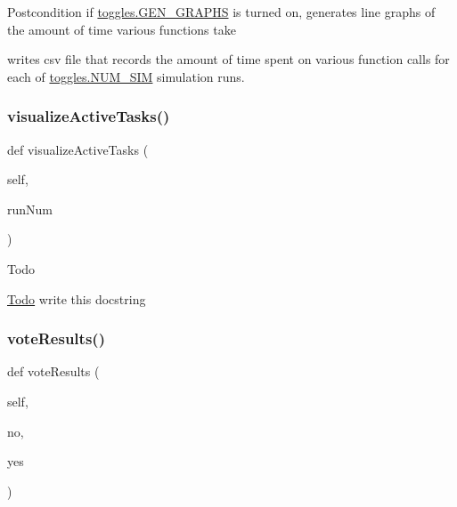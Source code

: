 \begin{DoxyPostcond}{Postcondition}
if \mbox{\hyperlink{namespacedynamicfilterapp_1_1toggles_a57c1e3f291181d680f3ee118fa5c4ab8}{toggles.\+G\+E\+N\+\_\+\+G\+R\+A\+P\+HS}} is turned on, generates line graphs of the amount of time various functions take 

writes csv file that records the amount of time spent on various function calls for each of \mbox{\hyperlink{namespacedynamicfilterapp_1_1toggles_a3baf5565851cd87736238d8dddfc1106}{toggles.\+N\+U\+M\+\_\+\+S\+IM}} simulation runs. 
\end{DoxyPostcond}
\mbox{\label{classdynamicfilterapp_1_1test__simulations_1_1_simulation_test_aa0a902fea4630659c86fb2964cbbd622}} 
\subsubsection{\texorpdfstring{visualizeActiveTasks()}{visualizeActiveTasks()}}
{\footnotesize\ttfamily def visualize\+Active\+Tasks (\begin{DoxyParamCaption}\item[{}]{self,  }\item[{}]{run\+Num }\end{DoxyParamCaption})}

\begin{DoxyRefDesc}{Todo}
\item[\mbox{\hyperlink{todo__todo000008}{Todo}}]write this docstring \end{DoxyRefDesc}
\mbox{\label{classdynamicfilterapp_1_1test__simulations_1_1_simulation_test_a042330aaf0a341a79e80194c2637c1ef}} 
\subsubsection{\texorpdfstring{voteResults()}{voteResults()}}
{\footnotesize\ttfamily def vote\+Results (\begin{DoxyParamCaption}\item[{}]{self,  }\item[{}]{no,  }\item[{}]{yes }\end{DoxyParamCaption})}


